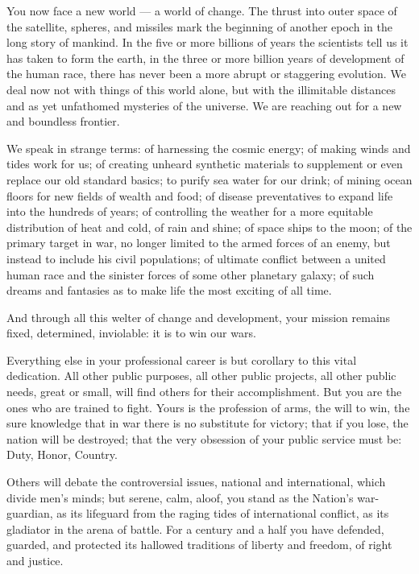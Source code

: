 \documentclass[a4paper]{amsbook}
\begin{document}
You now face a new world — a world of change. The thrust into outer space of the satellite, spheres, and missiles mark the beginning of another epoch in the long story of mankind. In the five or more billions of years the scientists tell us it has taken to form the earth, in the three or more billion years of development of the human race, there has never been a more abrupt or staggering evolution. We deal now not with things of this world alone, but with the illimitable distances and as yet unfathomed mysteries of the universe. We are reaching out for a new and boundless frontier.

We speak in strange terms: of harnessing the cosmic energy; of making winds and tides work for us; of creating unheard synthetic materials to supplement or even replace our old standard basics; to purify sea water for our drink; of mining ocean floors for new fields of wealth and food; of disease preventatives to expand life into the hundreds of years; of controlling the weather for a more equitable distribution of heat and cold, of rain and shine; of space ships to the moon; of the primary target in war, no longer limited to the armed forces of an enemy, but instead to include his civil populations; of ultimate conflict between a united human race and the sinister forces of some other planetary galaxy; of such dreams and fantasies as to make life the most exciting of all time.

And through all this welter of change and development, your mission remains fixed, determined, inviolable: it is to win our wars.

Everything else in your professional career is but corollary to this vital dedication. All other public purposes, all other public projects, all other public needs, great or small, will find others for their accomplishment. But you are the ones who are trained to fight. Yours is the profession of arms,  the will to win, the sure knowledge that in war there is no substitute for victory; that if you lose, the nation will be destroyed; that the very obsession of your public service must be: Duty, Honor, Country.

Others will debate the controversial issues, national and international, which divide men's minds; but serene, calm, aloof, you stand as the Nation's war-guardian, as its lifeguard from the raging tides of international conflict, as its gladiator in the arena of battle. For a century and a half you have defended, guarded, and protected its hallowed traditions of liberty and freedom, of right and justice.
\end{document}
